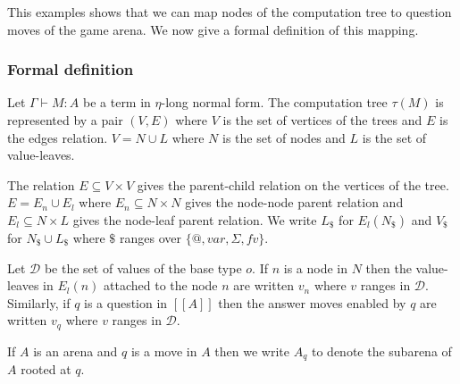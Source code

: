 \documentclass{llncs}
\newcommand{\lsem}{[\![} %
\newcommand{\rsem}{]\!]} %
\newcommand{\sem}[1]{{\lsem #1 \rsem}}
\newcommand\union{\cup}
\begin{document}
This examples shows that we can map nodes of the computation tree to question moves of the game arena.
We now give a formal definition of this mapping.

\subsubsection{Formal definition}

Let $\Gamma \vdash M : A$ be a term in $\eta$-long normal form. The computation tree $\tau(M)$
is represented by a pair $(V,E)$ where $V$ is the set of vertices of
the trees and $E$ is the edges relation. $V = N \union L$ where $N$
is the set of nodes and $L$ is the set of value-leaves.

The relation $E \subseteq V \times V$ gives the parent-child relation on the vertices of the tree.
$E = E_n \union E_l$ where $E_n \subseteq N \times N$ gives the node-node parent relation and $E_l \subseteq N \times L$ gives the node-leaf parent relation.
We write $L_\$$ for $E_l(N_\$)$
and $V_\$$  for $N_\$ \union L_\$$ where $\$$ ranges over $\{@, var, \Sigma, fv \}$.


Let $\mathcal{D}$ be the set of values of the base type $o$. If $n$
is a node in $N$ then the value-leaves in
$E_l(n)$ attached to the node $n$ are written $v_n$ where $v$ ranges in $\mathcal{D}$.
Similarly, if $q$ is a question in $\sem{A}$ then the answer moves
enabled by $q$ are written $v_q$ where $v$ ranges in $\mathcal{D}$.

If $A$ is an arena and $q$ is a move in $A$ then we write $A_q$ to
denote the subarena of $A$ rooted at $q$.
\end{document}
